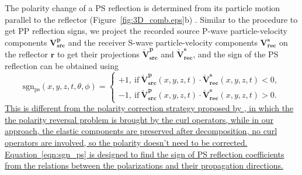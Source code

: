 \documentclass[manuscript,ulem,graphix,revised]{geophysics}
\begin{document}
The polarity change of a PS reflection is determined from its particle motion parallel to the reflector (Figure~\ref{fig:3D_comb.eps}b) \citep{aki80}. Similar to the procedure to get PP reflection signs, we project the recorded source P-wave particle-velocity components $\mathbf{V}^{\mathbf{p}}_{\mathbf{src}}$ and the receiver S-wave particle-velocity components $\mathbf{V}^{\mathbf{s}}_{\mathbf{rec}}$ on the reflector $\mathbf{r}$ to get their projections $\check{\mathbf{V}}^{\mathbf{p}}_{\mathbf{src}}$ and $\check{\mathbf{V}}^{\mathbf{s}}_{\mathbf{rec}}$, and the sign of the PS reflection can be obtained using
\begin{equation}
\mathrm{sgn_{ps}}(x,y,z,t,\theta,\phi)=\begin{cases}
 +1, \ \mathrm{if} \ \check{\mathbf{V}}^{\mathbf{p}}_{\mathbf{src}}(x,y,z,t) \cdot \check{\mathbf{V}}^{\mathbf{s}}_{\mathbf{rec}}(x,y,z,t)<0, \\ 
 -1, \ \mathrm{if} \ \check{\mathbf{V}}^{\mathbf{p}}_{\mathbf{src}}(x,y,z,t) \cdot \check{\mathbf{V}}^{\mathbf{s}}_{\mathbf{rec}}(x,y,z,t)>0 .
\end{cases}
\label{eqn:sgn_ps}
\end{equation}
\marginpar{[10]}\uline{This is different from the polarity correction strategy proposed by \mbox{\citet{du12, du14}}, in which the the polarity reversal problem is brought by the curl operators, while in our approach, the elastic components are preserved after decomposition, no curl operators are involved, so the polarity doesn't need to be corrected. Equation~\ref{eqn:sgn_ps} is designed to find the sign of PS reflection coefficients from the relations between the polarizations and their propagation directions.}
\end{document}
